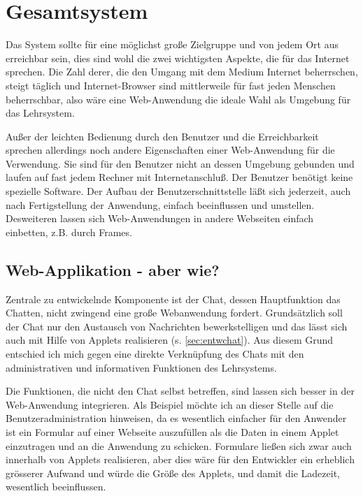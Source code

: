 \section{Gesamtsystem}

Das System sollte f\"ur eine m\"oglichst gro{\ss}e Zielgruppe und von jedem Ort aus
erreichbar sein, dies sind wohl die zwei wichtigsten Aspekte, die f\"ur das Internet
sprechen. Die Zahl derer, die den Umgang mit dem Medium Internet beherrschen, steigt
t\"aglich und Internet-Browser sind mittlerweile f\"ur fast jeden Menschen beherrschbar,
also w\"are eine Web-Anwendung die ideale Wahl als Umgebung f\"ur das Lehrsystem.

Au{\ss}er der leichten Bedienung durch den Benutzer und die Erreichbarkeit sprechen
allerdings noch andere Eigenschaften einer Web-Anwendung f\"ur die Verwendung. Sie
sind f\"ur den Benutzer nicht an dessen Umgebung gebunden und laufen auf fast jedem
Rechner mit Internetanschlu{\ss}. Der Benutzer ben\"otigt keine spezielle Software.
Der Aufbau der Benutzerschnittstelle l\"a{\ss}t sich jederzeit, auch nach Fertigstellung 
der Anwendung, einfach beeinflussen und umstellen. Desweiteren lassen sich Web-Anwendungen
in andere Webseiten einfach einbetten, z.B. durch Frames. 

\subsection{Web-Applikation - aber wie?}
Zentrale zu entwickelnde Komponente ist der Chat, dessen Hauptfunktion das Chatten, nicht zwingend
eine gro{\ss}e Webanwendung fordert. Grunds\"atzlich soll der Chat nur den Austausch von Nachrichten
bewerkstelligen und das l\"asst sich auch mit Hilfe von Applets realisieren (s. \ref{sec:entwchat}).
Aus diesem Grund entschied ich mich gegen eine direkte Verkn\"upfung des Chats mit den
administrativen und informativen Funktionen des Lehrsystems.

Die Funktionen, die nicht den Chat selbst betreffen, sind lassen sich besser in der Web-Anwendung
integrieren. Als Beispiel m\"ochte ich an dieser Stelle auf die Benutzeradministration hinweisen,
da es wesentlich einfacher f\"ur den Anwender ist ein Formular auf einer Webseite auszuf\"ullen als
die Daten in einem Applet einzutragen und an die Anwendung zu schicken. Formulare lie{\ss}en
sich zwar auch innerhalb von Applets realisieren, aber dies w\"are f\"ur den Entwickler ein
erheblich gr\"osserer Aufwand und w\"urde die Gr\"o{\ss}e des Applets, und damit die Ladezeit, wesentlich 
beeinflussen.

